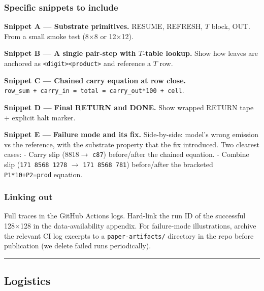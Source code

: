\documentclass[twocolumn,switch,10pt]{article}
\begin{document}
\subsubsection{Specific snippets to include}\label{specific-snippets-to-include}

\textbf{Snippet A --- Substrate primitives.} RESUME, REFRESH, \(T\) block, OUT.
From a small smoke test (8×8 or 12×12).

\textbf{Snippet B --- A single pair-step with \(T\)-table lookup.} Show how
leaves are anchored as \texttt{\textless{}digit\textgreater{}\textbar{}\textless{}product\textgreater{}} and reference a \(T\) row.

\textbf{Snippet C --- Chained carry equation at row close.}
\texttt{row\_sum\ +\ carry\_in\ =\ total\ =\ carry\_out*100\ +\ cell}.

\textbf{Snippet D --- Final RETURN and DONE.} Show wrapped RETURN tape +
explicit halt marker.

\textbf{Snippet E --- Failure mode and its fix.} Side-by-side: model's wrong
emission vs the reference, with the substrate property that the fix
introduced. Two clearest cases:
- Carry slip (\(8818 \to\) \texttt{c87}) before/after the chained equation.
- Combine slip (\texttt{1\textbar{}71\ 8\textbar{}568\ 1278} \(\to\) \texttt{1\textbar{}71\ 8\textbar{}568\ 781}) before/after
the bracketed \texttt{P1*10+P2=prod} equation.

\subsubsection{Linking out}\label{linking-out}

Full traces in the GitHub Actions logs. Hard-link the run ID of the
successful 128×128 in the data-availability appendix. For
failure-mode illustrations, archive the relevant CI log excerpts to
a \texttt{paper-artifacts/} directory in the repo before publication (we
delete failed runs periodically).

\begin{center}\rule{0.5\linewidth}{0.5pt}\end{center}

\subsection{Logistics}\label{logistics}
\end{document}
